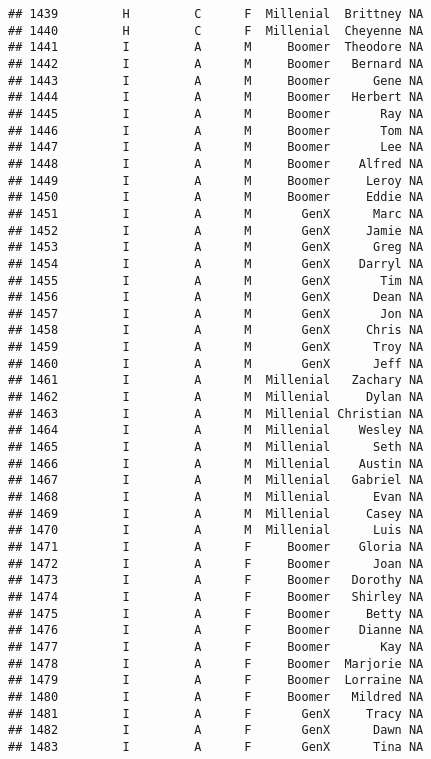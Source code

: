 \documentclass[
]{article}
\begin{document}
\begin{verbatim}
## 1439         H         C      F  Millenial  Brittney NA
## 1440         H         C      F  Millenial  Cheyenne NA
## 1441         I         A      M     Boomer  Theodore NA
## 1442         I         A      M     Boomer   Bernard NA
## 1443         I         A      M     Boomer      Gene NA
## 1444         I         A      M     Boomer   Herbert NA
## 1445         I         A      M     Boomer       Ray NA
## 1446         I         A      M     Boomer       Tom NA
## 1447         I         A      M     Boomer       Lee NA
## 1448         I         A      M     Boomer    Alfred NA
## 1449         I         A      M     Boomer     Leroy NA
## 1450         I         A      M     Boomer     Eddie NA
## 1451         I         A      M       GenX      Marc NA
## 1452         I         A      M       GenX     Jamie NA
## 1453         I         A      M       GenX      Greg NA
## 1454         I         A      M       GenX    Darryl NA
## 1455         I         A      M       GenX       Tim NA
## 1456         I         A      M       GenX      Dean NA
## 1457         I         A      M       GenX       Jon NA
## 1458         I         A      M       GenX     Chris NA
## 1459         I         A      M       GenX      Troy NA
## 1460         I         A      M       GenX      Jeff NA
## 1461         I         A      M  Millenial   Zachary NA
## 1462         I         A      M  Millenial     Dylan NA
## 1463         I         A      M  Millenial Christian NA
## 1464         I         A      M  Millenial    Wesley NA
## 1465         I         A      M  Millenial      Seth NA
## 1466         I         A      M  Millenial    Austin NA
## 1467         I         A      M  Millenial   Gabriel NA
## 1468         I         A      M  Millenial      Evan NA
## 1469         I         A      M  Millenial     Casey NA
## 1470         I         A      M  Millenial      Luis NA
## 1471         I         A      F     Boomer    Gloria NA
## 1472         I         A      F     Boomer      Joan NA
## 1473         I         A      F     Boomer   Dorothy NA
## 1474         I         A      F     Boomer   Shirley NA
## 1475         I         A      F     Boomer     Betty NA
## 1476         I         A      F     Boomer    Dianne NA
## 1477         I         A      F     Boomer       Kay NA
## 1478         I         A      F     Boomer  Marjorie NA
## 1479         I         A      F     Boomer  Lorraine NA
## 1480         I         A      F     Boomer   Mildred NA
## 1481         I         A      F       GenX     Tracy NA
## 1482         I         A      F       GenX      Dawn NA
## 1483         I         A      F       GenX      Tina NA

\end{verbatim}
\end{document}
